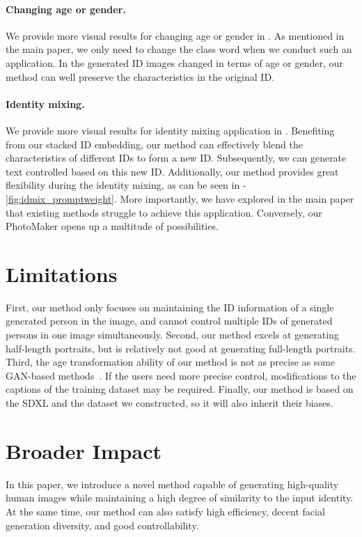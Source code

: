 \paragraph{Changing age or gender.}
We provide more visual results for changing age or gender in .
As mentioned in the main paper, 
we only need to change the class word when we conduct such an application.
In the generated ID images changed in terms of age or gender, our method can well preserve the characteristics in the original ID.


\paragraph{Identity mixing.}
We provide more visual results for identity mixing application in .
Benefiting from our stacked ID embedding, our method can effectively blend the characteristics of different IDs to form a new ID. Subsequently, we can generate text controlled based on this new ID.
Additionally, our method provides great flexibility during the identity mixing, as can be seen in -\ref{fig:idmix_promptweight}.
More importantly, we have explored in the main paper that existing methods struggle to achieve this application.
Conversely, our PhotoMaker opens up a multitude of possibilities.





\section{Limitations}

First, our method only focuses on maintaining the ID information of a single generated person in the image, and cannot control multiple IDs of generated persons in one image simultaneously.
Second, our method excels at generating half-length portraits, but is relatively not good at generating full-length portraits.
Third, the age transformation ability of our method is not as precise as some GAN-based methods~\cite{alaluf2021matter}. 
If the users need more precise control, modifications to the captions of the training dataset may be required.
Finally, our method is based on the SDXL and the dataset we constructed, so it will also inherit their biases.

\section{Broader Impact}
In this paper, we introduce a novel method capable of generating high-quality human images while maintaining a high degree of similarity to the input identity. 
At the same time, our method can also satisfy high efficiency, decent facial generation diversity, and good controllability.

